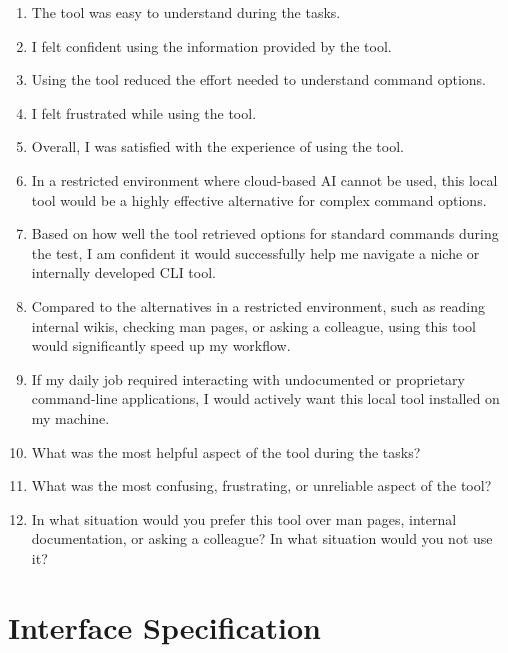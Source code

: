 \begin{appendix}
\begin{enumerate}
    \item The tool was easy to understand during the tasks.

    \item I felt confident using the information provided by the tool.

    \item Using the tool reduced the effort needed to understand command options.

    \item I felt frustrated while using the tool.

    \item Overall, I was satisfied with the experience of using the tool.

    \item In a restricted environment where cloud-based AI cannot be used, this local tool would be a highly effective alternative for complex command options.

    \item Based on how well the tool retrieved options for standard commands during the test, I am confident it would successfully help me navigate a niche or internally developed CLI tool.

    \item Compared to the alternatives in a restricted environment, such as reading internal wikis, checking man pages, or asking a colleague, using this tool would significantly speed up my workflow.

    \item If my daily job required interacting with undocumented or proprietary command-line applications, I would actively want this local tool installed on my machine.

    \item What was the most helpful aspect of the tool during the tasks?

    \item What was the most confusing, frustrating, or unreliable aspect of the tool?

    \item In what situation would you prefer this tool over man pages, internal documentation, or asking a colleague? In what situation would you not use it?
\end{enumerate}


\section{Interface Specification}\label{app:interfaces}


\end{appendix}
